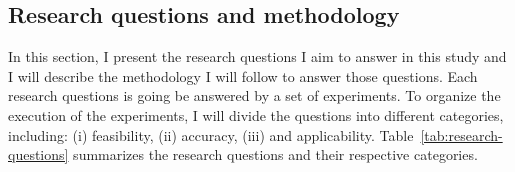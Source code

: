 \subsection{Research questions and methodology}
\label{subsec:research-questions-and-methodology}

In this section, I present the research questions I aim to answer in this study and I will describe the methodology I will follow to answer those questions.
Each research questions is going be answered by a set of experiments.
To organize the execution of the experiments, I will divide the questions into different categories, including:
(i) feasibility,
(ii) accuracy,
(iii) and applicability.
Table~\ref{tab:research-questions} summarizes the research questions and their respective categories.

\begin{table}[ht]
  \caption{Research questions}
  \label{tab:research-questions}
\end{table}


